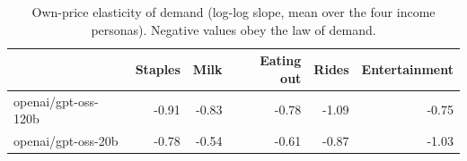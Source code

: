 \begin{table}[!htbp]\centering\small
\caption{Own-price elasticity of demand (log-log slope, mean over the four income personas). Negative values obey the law of demand.}\label{tab:own_price}
\begin{tabular}{lrrrrr}
\hline
 & Staples & Milk & Eating out & Rides & Entertainment \\ \hline
openai/gpt-oss-120b & -0.91 & -0.83 & -0.78 & -1.09 & -0.75 \\
openai/gpt-oss-20b & -0.78 & -0.54 & -0.61 & -0.87 & -1.03 \\
\hline
\end{tabular}
\end{table}